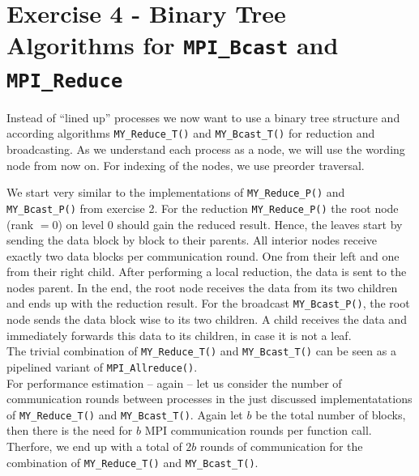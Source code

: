 \section{Exercise 4 - Binary Tree Algorithms for \texttt{MPI\_Bcast} and \texttt{MPI\_Reduce}}

Instead of “lined up” processes we now want to use a binary tree structure and according algorithms 
\texttt{MY\_Reduce\_T()} and \texttt{MY\_Bcast\_T()} for reduction and broadcasting. As we understand 
each process as a node, we will use the wording node from now on. For indexing of the nodes, we use preorder traversal.

We start very similar to the implementations of \texttt{MY\_Reduce\_P()} and \texttt{MY\_Bcast\_P()} 
from exercise 2. For the reduction \texttt{MY\_Reduce\_P()}  the root node (rank $=0$) on level 0 should 
gain the reduced result. Hence, the leaves start by sending the data block by block to their parents. All 
interior nodes receive exactly two data blocks per communication round. One from their left and one from their 
right child. After performing a local reduction, the data is sent to the nodes parent. In the end, the root 
node receives the data from its two children and ends up with the reduction result. For the broadcast 
\texttt{MY\_Bcast\_P()}, the root node sends the data block wise to its two children. A child receives 
the data and immediately forwards this data to its children, in case it is not a leaf.\\

The trivial combination of \texttt{MY\_Reduce\_T()} and \texttt{MY\_Bcast\_T()} can be seen 
as a pipelined variant of \texttt{MPI\_Allreduce()}.\\

For performance estimation -- again -- let us consider the number of communication rounds between processes in the 
just discussed implementatations of \texttt{MY\_Reduce\_T()} and \texttt{MY\_Bcast\_T()}. Again let $b$ 
be the total number of blocks, then there is the need for $b$ MPI communication rounds per function call. 
Therfore, we end up with a total of $2b$ rounds of communication for the combination of \texttt{MY\_Reduce\_T()} and 
\texttt{MY\_Bcast\_T()}.\\

